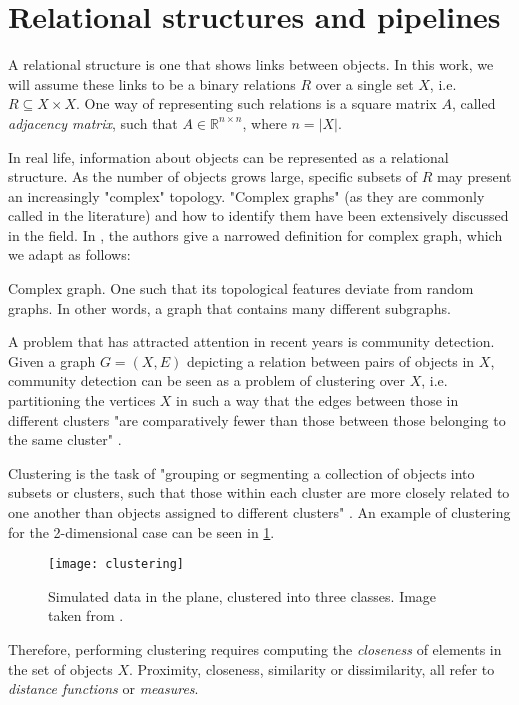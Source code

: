 \documentclass[../main.tex]{subfiles}
\begin{document}
\section{Relational structures and pipelines}\label{general_pipeline}
A relational structure is one that shows links between objects. In this work, we will assume these links to be a binary relations $R$ over a single set $X$, i.e. $R \subseteq X \times X$. One way of representing such relations is a square matrix $A$, called \emph{adjacency matrix}, such that $A \in \mathbb{R}^{n \times n}$, where $n =\left\vert{X}\right\vert$.
\par In real life, information about objects can be represented as a relational structure. As the number of objects grows large, specific subsets of $R$ may present an increasingly "complex" topology. "Complex graphs" (as they are commonly called in the literature) and how to identify them have been extensively discussed in the field. In \cite{Kim2008}, the authors give a narrowed definition for complex graph, which we adapt as follows:
\theoremstyle{definition}
\begin{definition}{Complex graph}. One such that its topological features deviate from random graphs. In other words, a graph that contains many different subgraphs.
\end{definition}
\par A problem that has attracted attention in recent years is community detection. Given a graph $G = (X, E)$ depicting a relation between pairs of objects in $X$, community detection can be seen as a problem of clustering over $X$, i.e. partitioning the vertices $X$ in such a way that the edges between those in different clusters "are comparatively fewer than those between those belonging to the same cluster" \cite{Fortunato2010}. 
\par Clustering is the task of "grouping or segmenting a collection of objects into subsets or clusters, such that those within each cluster are more closely related to one another than objects assigned to different clusters" \cite{hastie2008}. An example of clustering for the 2-dimensional case can be seen in \ref{clustering}.
\begin{figure}[h]
\centering
\texttt{[image: clustering]}
\caption{Simulated data in the plane, clustered into three classes. Image taken from \cite{hastie2008}.}
\label{clustering}
\end{figure}
\par Therefore, performing clustering requires computing the \emph{closeness} of elements in the set of objects $X$. Proximity, closeness, similarity or dissimilarity, all refer to \emph{distance functions} or \emph{measures}. 
\end{document}
